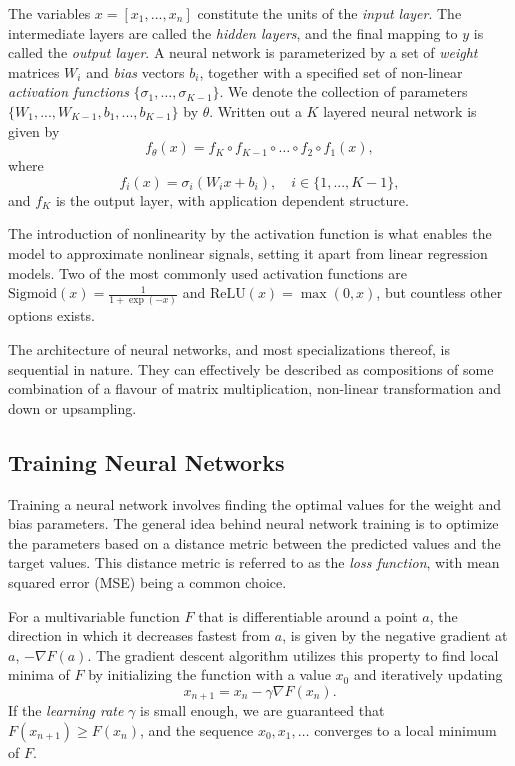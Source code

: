\documentclass[../../thesis.tex]{subfiles}
\begin{document}
The variables $x = [x_1,...,x_n]$ constitute the units of the \textit{input layer}. The intermediate layers are called the \textit{hidden layers}, and the final mapping to $y$ is called the \textit{output layer}. A neural network is parameterized by a set of \textit{weight} matrices $W_i$ and \textit{bias} vectors $b_i$, together with a specified set of non-linear \textit{activation functions} $\{\sigma_1,\dots,\sigma_{K-1}\}$. We denote the collection of parameters $\{W_1,...,W_{K-1}, b_1,...,b_{K-1}\}$ by $\theta$. Written out a $K$ layered neural network is given by 
\[ 
f_\theta(x) = f_K \circ f_{K-1} \circ \ldots \circ f_2 \circ f_1(x),
\]
where 
$$f_i(x) = \sigma_i(W_ix+b_i), \quad i \in \{1,...,K-1\},$$ 
and $f_K$ is the output layer, with application dependent structure.\newline

The introduction of nonlinearity by the activation function is what enables the model to approximate nonlinear signals, setting it apart from linear regression models. Two of the most commonly used activation functions are $\text{Sigmoid}(x) = \tfrac{1}{1+\exp(-x)}$ and $\text{ReLU}(x) = \max(0,x)$, but countless other options exists.\newline

The architecture of neural networks, and most specializations thereof, is sequential in nature. They can effectively be described as compositions of some combination of a flavour of matrix multiplication, non-linear transformation and down or upsampling. 

\subsection{Training Neural Networks}

Training a neural network involves finding the optimal values for the weight and bias parameters. The general idea behind neural network training is to optimize the parameters based on a distance metric between the predicted values and the target values. This distance metric is referred to as the \textit{loss function}, with mean squared error (MSE) being a common choice.\newline

For a multivariable function $F$ that is differentiable around a point $a$, the direction in which it decreases fastest from $a$, is given by the negative gradient at $a$, $-\nabla F(a)$. The gradient descent algorithm utilizes this property to find local minima of $F$ by initializing the function with a value $x_0$ and iteratively updating 
\[
    x_{n+1} = x_{n} -\gamma \nabla F(x_{n}).
\] 
If the \textit{learning rate} $\gamma$ is small enough, we are guaranteed that $F(x_{n+1})\geq F(x_{n})$, and the sequence $x_0,x_1,\dots$ converges to a local minimum of $F$.\newline
\end{document}
